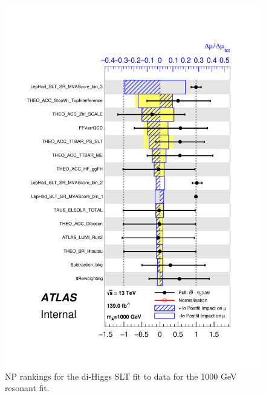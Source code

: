 \begin{figure}
\centering
\includegraphics[width=.8\textwidth]{figures/results/HH/LepHad/pulls_SigXsecOverSM_1000_SLT.pdf}
\caption{NP rankings for the di-Higgs \lephad SLT fit to data for the 1000 GeV resonant fit.}
\label{fig:LepHadPostfitNPRankings2HDM1000SLT}
\end{figure}


